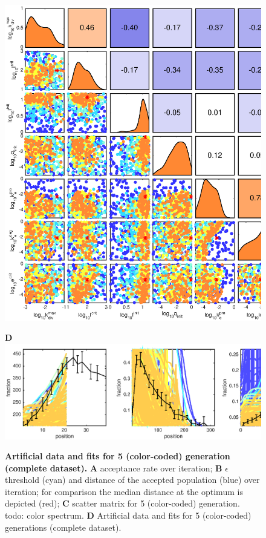 \documentclass[10pt,letterpaper]{article}
\begin{document}
\begin{figure}[htbp]
\begin{minipage}[t]{0.66\textwidth}
\includegraphics[width=\textwidth]{Figures/FitToyData2c}
\end{minipage}
\textbf{D}\\
\includegraphics[width=\textwidth]{Figures/FitToyData1.eps}
\caption{{\bf Artificial data and fits for 5 (color-coded) generation (complete dataset).}
\textbf{A}  acceptance rate over iteration; \textbf{B} $\epsilon$ threshold (cyan) and distance of the accepted population (blue) over iteration; for comparison the median distance at the optimum is depicted (red); \textbf{C} scatter matrix for 5 (color-coded) generation. todo: color spectrum. \textbf{D} Artificial data and fits for 5 (color-coded) generations (complete dataset).}
\label{fig3}
\end{figure}
\end{document}
